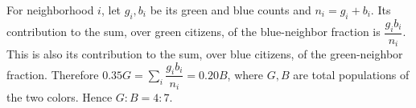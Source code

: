 For neighborhood $i$, let $g_i,b_i$ be its green and blue counts and $n_i=g_i+b_i$. Its contribution to the sum, over green citizens, of the blue-neighbor fraction is $\dfrac{g_ib_i}{n_i}$. This is also its contribution to the sum, over blue citizens, of the green-neighbor fraction. Therefore $0.35G=\sum_i \dfrac{g_ib_i}{n_i}=0.20B$, where $G,B$ are total populations of the two colors. Hence $\boxed{G:B=4:7}$.
